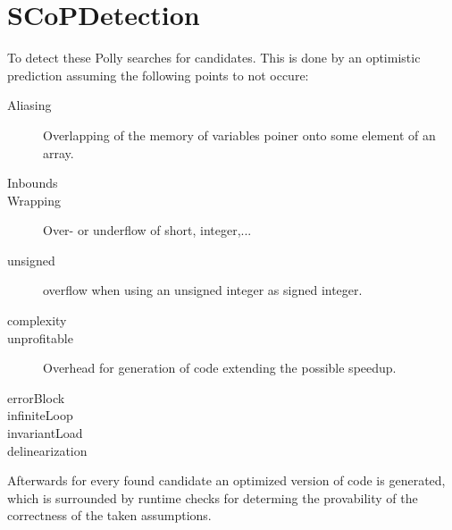 \section{SCoPDetection}
To detect these \scops Polly searches for candidates.
This is done by an optimistic prediction  assuming the following points to not occure:
\begin{description}
    \item[Aliasing] Overlapping of the memory of variables \eg poiner onto some element of an array.
    \item[Inbounds] 
    \item[Wrapping] Over- or underflow of short, integer,...
    \item[unsigned] \Eg overflow when using an unsigned integer as signed integer.
    \item[complexity] 
    \item[unprofitable] Overhead for generation of code extending the possible speedup.
    \item[errorBlock]
    \item[infiniteLoop]
    \item[invariantLoad]
    \item[delinearization]
\end{description}

Afterwards for every found candidate an optimized version of code is generated, which is surrounded by runtime checks for determing the provability of the correctness of the taken assumptions.
